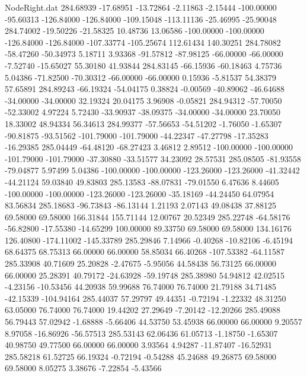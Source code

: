 \begin{filecontents}{NodeRight.dat}
 284.68939  -17.68951  -13.72864    -2.11863   -2.15444 -100.00000  -95.60313 -126.84000 -126.84000 -109.15048 -113.11136  -25.46995  -25.90048
 284.74002  -19.50226  -21.58325    10.48736   13.06586 -100.00000 -100.00000 -126.84000 -126.84000 -107.33774 -105.25674  112.61434  140.30251
 284.78082  -58.47260  -50.34973     5.18711    3.93368  -91.57812  -87.98125  -66.00000  -66.00000   -7.52740  -15.65027   55.30180   41.93844
 284.83145  -66.15936  -60.18463     4.75736    5.04386  -71.82500  -70.30312  -66.00000  -66.00000    0.15936   -5.81537   54.38379   57.65891
 284.89243  -66.19324  -54.04175     0.38824   -0.00569  -40.89062  -46.64688  -34.00000  -34.00000   32.19324   20.04175    3.96908   -0.05821
 284.94312  -57.70050  -52.33002     4.97224    5.72430  -33.90937  -38.09375  -34.00000  -34.00000   23.70050   18.33002   48.94334   56.34613
 284.99377  -57.56653  -54.51202    -1.76050   -1.65307  -90.81875  -93.51562 -101.79000 -101.79000  -44.22347  -47.27798  -17.35283  -16.29385
 285.04449  -64.48120  -68.27423     3.46812    2.89512 -100.00000 -100.00000 -101.79000 -101.79000  -37.30880  -33.51577   34.23092   28.57531
 285.08505  -81.93558  -79.04877     5.97499    5.04386 -100.00000 -100.00000 -123.26000 -123.26000  -41.32442  -44.21124   59.03840   49.83803
 285.13583  -88.07831  -79.01550     6.47636    8.44605 -100.00000 -100.00000 -123.26000 -123.26000  -35.18169  -44.24450   64.07954   83.56834
 285.18683  -96.73843  -86.13144     1.21193    2.07143   49.08438   37.88125   69.58000   69.58000  166.31844  155.71144   12.00767   20.52349
 285.22748  -64.58176  -56.82800   -17.55380  -14.65299  100.00000   89.33750   69.58000   69.58000  134.16176  126.40800 -174.11002 -145.33789
 285.29846    7.14966   -0.40268   -10.82106   -6.45194   68.64375   68.75313   66.00000   66.00000   58.85034   66.40268 -107.53382  -64.11587
 285.33908   40.71609   25.20828    -2.47675   -5.95056   44.58438   56.73125   66.00000   66.00000   25.28391   40.79172  -24.63928  -59.19748
 285.38980   54.94812   42.02515    -4.23156  -10.53456   44.20938   59.99688   76.74000   76.74000   21.79188   34.71485  -42.15339 -104.94164
 285.44037   57.29797   49.44351    -0.72194   -1.22332   48.31250   63.05000   76.74000   76.74000   19.44202   27.29649   -7.20142  -12.20266
 285.49088   56.79443   57.02942    -1.68888   -5.66406   44.53750   53.45938   66.00000   66.00000    9.20557    8.97058  -16.86926  -56.57513
 285.53143   62.06436   61.05713    -1.18750   -1.65307   40.98750   49.77500   66.00000   66.00000    3.93564    4.94287  -11.87407  -16.52931
 285.58218   61.52725   66.19324    -0.72194   -0.54288   45.24688   49.26875   69.58000   69.58000    8.05275    3.38676   -7.22854   -5.43566

\end{filecontents}
